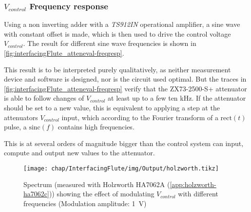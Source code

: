 \subsubsection{$V_{control}$ Frequency response}\label{sec:interfacingFlute_freqr}
Using a non inverting adder with a \textit{TS912IN} operational amplifier, a sine wave with constant offset is made, which is then used to drive the control voltage $V_{control}$. The result for different sine wave frequencies is shown in \autoref{fig:interfacingFlute_atteneval-freqresp}.

This result is to be interpreted purely qualitatively, as neither measurement device and software is designed, nor is the circuit used optimal.
But the traces in \autoref{fig:interfacingFlute_atteneval-freqresp} verify that the ZX73-2500-S+ attenuator is able to follow changes of $V_{control}$ at least up to a few ten \si{\kHz}. If the attenuator should be set to a new value, this is equivalent to applying a step at the attenuators $V_{control}$ input, which according to the Fourier transform of a $\text{rect}(t)$ pulse, a $\text{sinc}(f)$ contains high frequencies.

This is at several orders of magnitude bigger than the control system can input, compute and output new values to the attenuator.

\begin{figure}[tb]
	\centering
	\texttt{[image: chap/InterfacingFlute/img/Output/holzworth.tikz]}
	\caption{Spectrum (measured with Holzworth HA7062A (\autoref{app:holzworth-ha7062c})) showing the effect of modulating $V_{control}$ with different frequencies (Modulation amplitude: \SI{1}{\volt})}
	\label{fig:interfacingFlute_atteneval-freqresp}
\end{figure}

